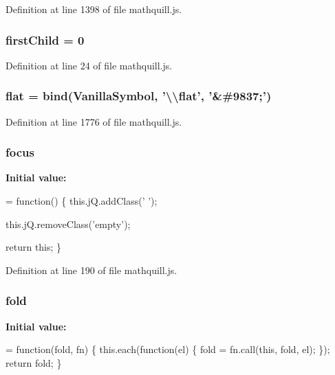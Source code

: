 Definition at line 1398 of file mathquill.\-js.

\subsubsection[{first\-Child}]{\setlength{\rightskip}{0pt plus 5cm}{\bf \-\_\-} first\-Child = 0}\label{mathquill_8js_a4ca51048c4a62af69119505b5fdd1bdf}


Definition at line 24 of file mathquill.\-js.

\subsubsection[{flat}]{ flat = {\bf bind}({\bf Vanilla\-Symbol}, '\textbackslash{}\textbackslash{}flat', '\&\#9837;')}\label{mathquill_8js_a94144592554975b13a6c34f5d25ef9ac}


Definition at line 1776 of file mathquill.\-js.

\subsubsection[{focus}]{\setlength{\rightskip}{0pt plus 5cm}{\bf \-\_\-} focus}\label{mathquill_8js_a265b37d0aa5c0cd8bddebf5546a83b8b}
{\bfseries Initial value\-:}
\begin{DoxyCode}
= \textcolor{keyword}{function}() \{
  this.jQ.addClass(\textcolor{stringliteral}{'  '});

    this.jQ.removeClass(\textcolor{stringliteral}{'empty'});

  \textcolor{keywordflow}{return} \textcolor{keyword}{this};
\}
\end{DoxyCode}


Definition at line 190 of file mathquill.\-js.

\subsubsection[{fold}]{\setlength{\rightskip}{0pt plus 5cm}{\bf \-\_\-} fold}\label{mathquill_8js_af88d5f8144a733ed291466618f831835}
{\bfseries Initial value\-:}
\begin{DoxyCode}
= \textcolor{keyword}{function}(fold, fn) \{
  this.each(\textcolor{keyword}{function}(el) \{
    fold = fn.call(\textcolor{keyword}{this}, fold, el);
  \});
  \textcolor{keywordflow}{return} fold;
\}
\end{DoxyCode}


